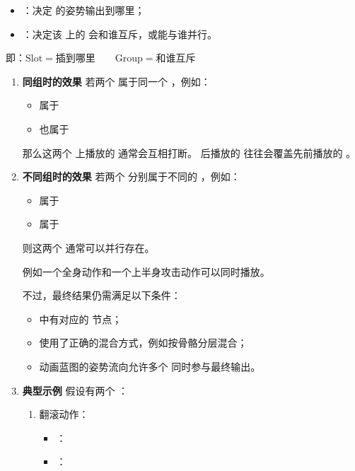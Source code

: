 \begin{itemize}
	\item {}：决定  的姿势输出到哪里；
	\item {}：决定该  上的  会和谁互斥，或能与谁并行。
\end{itemize}
即：$
\text{Slot} = \text{插到哪里}
\qquad
\text{Group} = \text{和谁互斥}
$
\begin{enumerate}
	\item \textbf{同组时的效果}
	若两个  属于同一个 ，例如：
	
	\begin{itemize}
		\item {} 属于 
		\item {} 也属于 
	\end{itemize}
	
	那么这两个  上播放的  通常会互相打断。  
	后播放的  往往会覆盖先前播放的 。
	
	\item \textbf{不同组时的效果}
	若两个  分别属于不同的 ，例如：
	
	\begin{itemize}
		\item {} 属于 
		\item {} 属于 
	\end{itemize}
	
	则这两个  通常可以并行存在。  
	
	
	例如一个全身动作和一个上半身攻击动作可以同时播放。
	
	不过，最终结果仍需满足以下条件：
	
	\begin{itemize}
		\item {} 中有对应的  节点；
		\item 使用了正确的混合方式，例如按骨骼分层混合；
		\item 动画蓝图的姿势流向允许多个  同时参与最终输出。
	\end{itemize}
	
	\item \textbf{典型示例}
	假设有两个 ：
	
	\begin{enumerate}
		\item 翻滚动作：
		\begin{itemize}
			\item {}：
			\item {}：
		\end{itemize}
		

\end{enumerate}
\end{enumerate}
